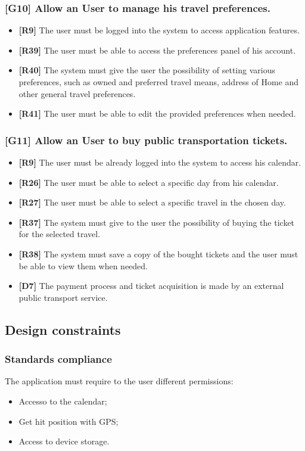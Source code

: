 \subsubsection{[G10] Allow an User to manage his travel preferences.}
	\begin{itemize}
		\item \textbf{[R9]} The user must be logged into the system to access application features.
		\item \textbf{[R39]} The user must be able to access the preferences panel of his account.
		\item \textbf{[R40]} The system must give the user the possibility of setting various preferences, such as owned and preferred travel means, address of Home and other general travel preferences.
		\item \textbf{[R41]} The user must be able to edit the provided preferences when needed.
		
	\end{itemize}
\subsubsection{[G11] Allow an User to buy public transportation tickets.}
	\begin{itemize}
		\item \textbf{[R9]} The user must be already logged into the system to access his calendar.
		\item \textbf{[R26]} The user must be able to select a specific day from his calendar.
		\item \textbf{[R27]} The user must be able to select a specific travel in the chosen day.
		\item \textbf{[R37]} The system must give to the user the possibility of buying the ticket for the selected travel.
		\item \textbf{[R38]} The system must save a copy of the bought tickets and the user must be able to view them when needed.
		\item \textbf{[D7]} The payment process and ticket acquisition is made by an external public transport service.
	\end{itemize}
\subsection{Design constraints}
\subsubsection{Standards compliance}
The application must require to the user different permissions:
	\begin{itemize}
		\item Accesso to the calendar;
		\item Get hit position with GPS;
		\item Access to device storage.
	\end{itemize}
